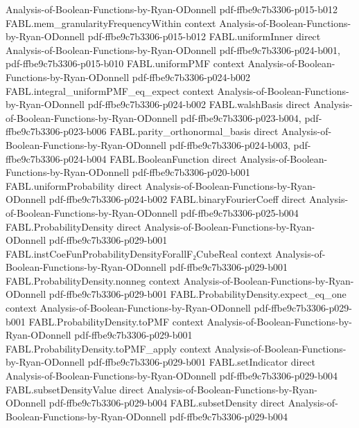 \begin{theorem}
  {Analysis-of-Boolean-Functions-by-Ryan-ODonnell}
  {pdf-ffbe9c7b3306-p015-b012}
\proofstep
  {FABL.mem_granularityFrequencyWithin}
  {context}
  {Analysis-of-Boolean-Functions-by-Ryan-ODonnell}
  {pdf-ffbe9c7b3306-p015-b012}
\proofstep
  {FABL.uniformInner}
  {direct}
  {Analysis-of-Boolean-Functions-by-Ryan-ODonnell}
  {pdf-ffbe9c7b3306-p024-b001,
    pdf-ffbe9c7b3306-p015-b010}
\proofstep
  {FABL.uniformPMF}
  {context}
  {Analysis-of-Boolean-Functions-by-Ryan-ODonnell}
  {pdf-ffbe9c7b3306-p024-b002}
\proofstep
  {FABL.integral_uniformPMF_eq_expect}
  {context}
  {Analysis-of-Boolean-Functions-by-Ryan-ODonnell}
  {pdf-ffbe9c7b3306-p024-b002}
\proofstep
  {FABL.walshBasis}
  {direct}
  {Analysis-of-Boolean-Functions-by-Ryan-ODonnell}
  {pdf-ffbe9c7b3306-p023-b004,
    pdf-ffbe9c7b3306-p023-b006}
\proofstep
  {FABL.parity_orthonormal_basis}
  {direct}
  {Analysis-of-Boolean-Functions-by-Ryan-ODonnell}
  {pdf-ffbe9c7b3306-p024-b003,
    pdf-ffbe9c7b3306-p024-b004}
\proofstep
  {FABL.BooleanFunction}
  {direct}
  {Analysis-of-Boolean-Functions-by-Ryan-ODonnell}
  {pdf-ffbe9c7b3306-p020-b001}
\proofstep
  {FABL.uniformProbability}
  {direct}
  {Analysis-of-Boolean-Functions-by-Ryan-ODonnell}
  {pdf-ffbe9c7b3306-p024-b002}
\proofstep
  {FABL.binaryFourierCoeff}
  {direct}
  {Analysis-of-Boolean-Functions-by-Ryan-ODonnell}
  {pdf-ffbe9c7b3306-p025-b004}
\proofstep
  {FABL.ProbabilityDensity}
  {direct}
  {Analysis-of-Boolean-Functions-by-Ryan-ODonnell}
  {pdf-ffbe9c7b3306-p029-b001}
\proofstep
  {FABL.instCoeFunProbabilityDensityForallF₂CubeReal}
  {context}
  {Analysis-of-Boolean-Functions-by-Ryan-ODonnell}
  {pdf-ffbe9c7b3306-p029-b001}
\proofstep
  {FABL.ProbabilityDensity.nonneg}
  {context}
  {Analysis-of-Boolean-Functions-by-Ryan-ODonnell}
  {pdf-ffbe9c7b3306-p029-b001}
\proofstep
  {FABL.ProbabilityDensity.expect_eq_one}
  {context}
  {Analysis-of-Boolean-Functions-by-Ryan-ODonnell}
  {pdf-ffbe9c7b3306-p029-b001}
\proofstep
  {FABL.ProbabilityDensity.toPMF}
  {context}
  {Analysis-of-Boolean-Functions-by-Ryan-ODonnell}
  {pdf-ffbe9c7b3306-p029-b001}
\proofstep
  {FABL.ProbabilityDensity.toPMF_apply}
  {context}
  {Analysis-of-Boolean-Functions-by-Ryan-ODonnell}
  {pdf-ffbe9c7b3306-p029-b001}
\proofstep
  {FABL.setIndicator}
  {direct}
  {Analysis-of-Boolean-Functions-by-Ryan-ODonnell}
  {pdf-ffbe9c7b3306-p029-b004}
\proofstep
  {FABL.subsetDensityValue}
  {direct}
  {Analysis-of-Boolean-Functions-by-Ryan-ODonnell}
  {pdf-ffbe9c7b3306-p029-b004}
\proofstep
  {FABL.subsetDensity}
  {direct}
  {Analysis-of-Boolean-Functions-by-Ryan-ODonnell}
  {pdf-ffbe9c7b3306-p029-b004}

\end{theorem}

